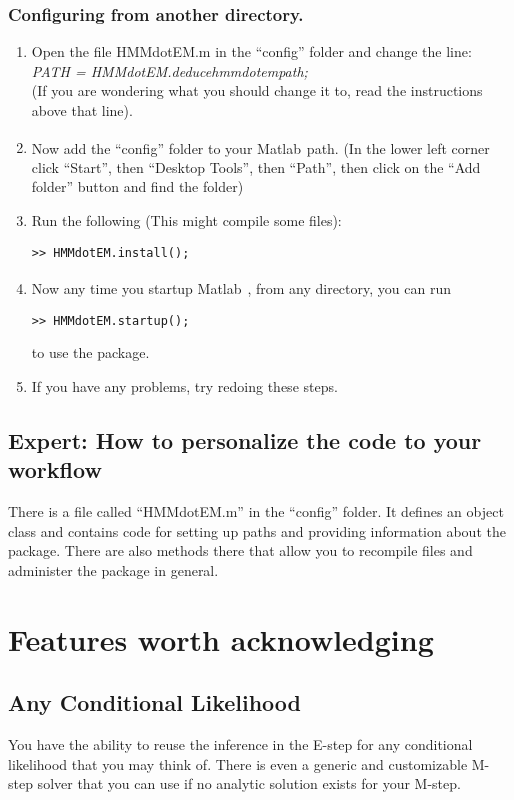 \documentclass[]{scrreprt}
\newcommand{\Matlab}{Matlab\textsuperscript{\textregistered~}}
\begin{document}
\subsection{Configuring from another directory.}
\begin{enumerate}
  \item Open the file HMMdotEM.m in the ``config''
folder and change the line:\\{\it PATH = HMMdotEM.deducehmmdotempath;}\\
(If you are wondering what you should change it to, read the instructions above
that line). 
  \item Now add the ``config'' folder to your \Matlab path. (In the
  lower left corner click ``Start'', then ``Desktop Tools'', then ``Path'',
  then click on the ``Add folder'' button and find the folder)
  \item Run the following (This might compile some files):
  \begin{verbatim}>> HMMdotEM.install();\end{verbatim}
  \item Now any time you startup \Matlab, from any directory, you can run
  \begin{verbatim}>> HMMdotEM.startup(); \end{verbatim}
  to use the package.
  \item If you have any problems, try redoing these steps.
\end{enumerate}

\section{Expert: How to personalize the code to your workflow}
There is a file called ``HMMdotEM.m'' in the ``config'' folder. It
defines an object class and contains code for setting up paths and providing
information about the package. There are also methods there that allow you to
recompile files and administer the package in general.

\chapter{Features worth acknowledging}
\section{Any Conditional Likelihood}
You have the ability to reuse the inference in the E-step for any conditional
likelihood that you may think of. There is even a generic and customizable
M-step solver that you can use if no analytic solution exists for your M-step.
\end{document}

